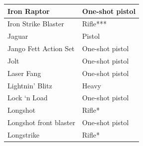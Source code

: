 \begin{table}
\begin{tabular}{|l|l|}
 \hline Iron Raptor & One-shot pistol \\
 \hline Iron Strike Blaster & Rifle*** \\
 \hline Jaguar & Pistol \\
 \hline Jango Fett Action Set & One-shot pistol \\
 \hline Jolt & One-shot pistol \\
 \hline Laser Fang & One-shot pistol \\
 \hline Lightnin' Blitz & Heavy \\
 \hline Lock `n Load & One-shot pistol \\
 \hline Longshot & Rifle* \\
 \hline Longshot front blaster & One-shot pistol \\
 \hline Longstrike & Rifle* \\
 \hline \end{tabular}

\end{table}

